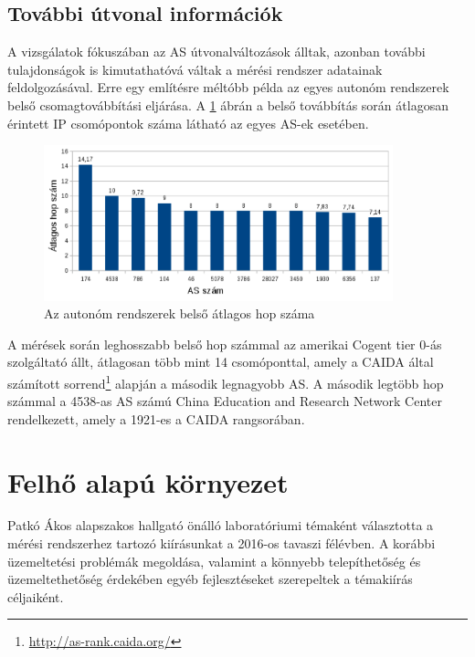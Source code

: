 \subsection{További útvonal információk}

A vizsgálatok fókuszában az AS útvonalváltozások álltak, azonban további tulajdonságok is kimutathatóvá váltak a mérési rendszer adatainak feldolgozásával. Erre egy említésre méltóbb példa az egyes autonóm rendszerek belső csomagtovábbítási eljárása. A \ref{fig:as-inside} ábrán a belső továbbítás során átlagosan érintett IP csomópontok száma látható az egyes AS-ek esetében.

\begin{figure}[!ht]
	\centering
	\includegraphics[width=0.9\textwidth, keepaspectratio]{figures/as-inside.PNG}
	\caption{Az autonóm rendszerek belső átlagos hop száma}
	\label{fig:as-inside}
\end{figure}

A mérések során leghosszabb belső hop számmal az amerikai Cogent tier 0-ás szolgáltató állt, átlagosan több mint 14 csomóponttal, amely a CAIDA által számított sorrend\footnote{\url{http://as-rank.caida.org/}} alapján a második legnagyobb AS. A második legtöbb hop számmal a 4538-as AS számú China Education and Research Network Center rendelkezett, amely a 1921-es a CAIDA rangsorában.


\section{Felhő alapú környezet}


Patkó Ákos alapszakos hallgató önálló laboratóriumi témaként választotta a mérési rendszerhez tartozó kiírásunkat a 2016-os tavaszi félévben. A korábbi üzemeltetési problémák megoldása, valamint a könnyebb telepíthetőség és üzemeltethetőség érdekében egyéb fejlesztéseket szerepeltek a témakiírás céljaiként.

